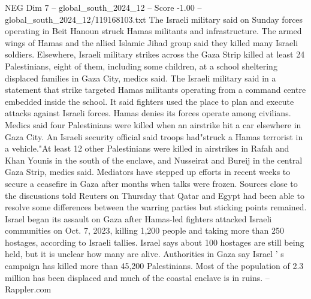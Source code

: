 \begin{textsample}{NEG Dim 7 – global\_south\_2024\_12 – Score -1.00 – global\_south\_2024\_12/119168103.txt}
The Israeli military said on Sunday forces operating in Beit Hanoun struck Hamas militants and infrastructure.
The armed wings of Hamas and the allied Islamic Jihad group said they killed many Israeli soldiers.
Elsewhere, Israeli military strikes across the Gaza Strip killed at least 24 Palestinians, eight of them, including some children, at a school sheltering displaced families in Gaza City, medics said.
The Israeli military said in a statement that strike targeted Hamas militants operating from a command centre embedded inside the school.
It said fighters used the place to plan and execute attacks against Israeli forces.
Hamas denies its forces operate among civilians.
Medics said four Palestinians were killed when an airstrike hit a car elsewhere in Gaza City.
An Israeli security official said troops had"struck a Hamas terrorist in a vehicle."At least 12 other Palestinians were killed in airstrikes in Rafah and Khan Younis in the south of the enclave, and Nusseirat and Bureij in the central Gaza Strip, medics said.
Mediators have stepped up efforts in recent weeks to secure a ceasefire in Gaza after months when talks were frozen.
Sources close to the discussions told Reuters on Thursday that Qatar and Egypt had been able to resolve some differences between the warring parties but sticking points remained.
Israel began its assault on Gaza after Hamas-led fighters attacked Israeli communities on Oct. 7, 2023, killing 1,200 people and taking more than 250 hostages, according to Israeli tallies.
Israel says about 100 hostages are still being held, but it is unclear how many are alive.
Authorities in Gaza say Israel ' s campaign has killed more than 45,200 Palestinians.
Most of the population of 2.3 million has been displaced and much of the coastal enclave is in ruins. -- Rappler.com

\end{textsample}
